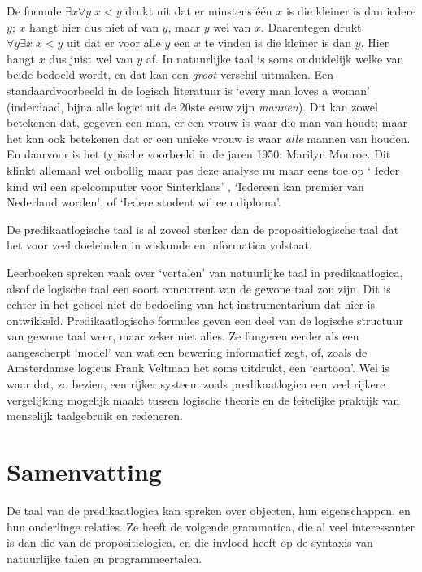 \begin{example}
De formule $\exists x\forall y\; x<y$ drukt uit dat er minstens \'e\'en $x$ is die kleiner is dan iedere $y$; $x$ hangt hier dus niet af van $y$, maar $y$ wel van $x$. Daarentegen drukt $\forall y\exists x\; x<y$ uit dat er voor alle $y$ een $x$ te vinden is die kleiner is dan $y$. Hier hangt $x$ dus juist wel van $y$ af. In natuurlijke taal is soms onduidelijk welke van beide bedoeld wordt, en dat kan een \textit{groot} verschil uitmaken. Een standaardvoorbeeld in de logisch literatuur is `every man loves a woman' (inderdaad, bijna alle logici uit de 20ste eeuw zijn \textit{mannen}). Dit kan zowel betekenen dat, gegeven een man, er een vrouw is waar die man van houdt; maar het kan ook betekenen dat er een unieke vrouw is waar \textit{alle} mannen van houden. En daarvoor is het typische voorbeeld in de jaren 1950: Marilyn Monroe. Dit klinkt allemaal wel oubollig maar pas deze analyse nu maar eens toe op ` Ieder kind wil een spelcomputer voor Sinterklaas' , `Iedereen kan premier van Nederland worden', of `Iedere student wil een diploma'.
\end{example}

De predikaatlogische taal is al zoveel sterker dan de propositielogische taal dat het voor veel doeleinden in wiskunde en informatica volstaat. %

Leerboeken spreken vaak over `vertalen' van natuurlijke taal in predikaatlogica, alsof de logische taal een soort concurrent van de gewone taal zou zijn. Dit is echter in het geheel niet de bedoeling van het instrumentarium dat hier is ontwikkeld. Predikaatlogische formules geven een deel van de logische structuur van gewone taal weer, maar zeker niet alles. Ze fungeren eerder als een aangescherpt `model' van wat een bewering informatief zegt, of, zoals de Amsterdamse logicus Frank Veltman het soms uitdrukt, een `cartoon'. Wel is waar dat, zo bezien, een rijker systeem zoals predikaatlogica een veel rijkere vergelijking mogelijk maakt tussen logische theorie en de feitelijke praktijk van menselijk taalgebruik en redeneren.

\section{Samenvatting}
De taal van de predikaatlogica kan spreken over objecten, hun eigenschappen, en hun onderlinge relaties. Ze heeft de volgende grammatica, die al veel interessanter is dan die van de propositielogica, en die invloed heeft op de syntaxis van natuurlijke talen en programmeertalen.

